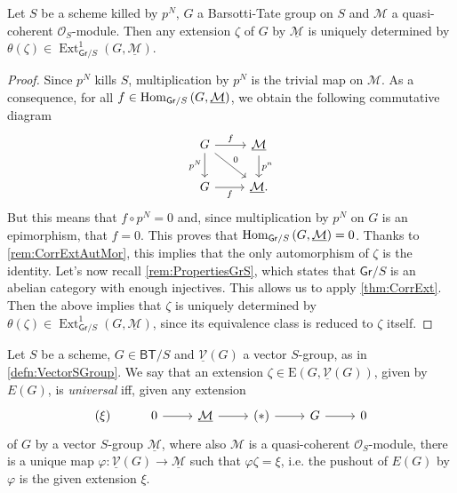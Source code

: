 \newpage
\begin{lem}\label{lem:rigidityExt}
	Let $S$ be a scheme killed by $p^N$, $G$ a Barsotti-Tate group on $S$
	and $\mathcal{M}$ a quasi-coherent $\mathcal{O}_S$-module.
	Then any extension $\zeta$ of $G$ by $\underline{\mathcal{M}}$ is
	uniquely determined by $\theta(\zeta) \in 
	\operatorname{Ext}^1_{\mathsf{Gr}/S}(G, \underline{\mathcal{M}})$.
\end{lem} 
\begin{proof}
	Since $p^N$ kills $S$, multiplication by $p^N$ 
	is the trivial map on $\mathcal{M}$.
	As a consequence, for all $f \in \operatorname{Hom}_{\mathsf{Gr}/S}
	\left( G, \underline{\mathcal{M}} \right)$,
	we obtain the following commutative diagram
	\begin{equation*}
	\begin{tikzcd}
		G \arrow[r, "f", rightarrow] 
		\arrow[d, "p^N"', rightarrow] 
		\arrow[rd, "0", rightarrow] &
		\underline{\mathcal{M}} \arrow[d, "p^n", rightarrow] \\
		G \arrow[r, "f"', rightarrow] &
		\underline{\mathcal{M}}
	.\end{tikzcd}
	\end{equation*}
	But this means that $f \circ p^N = 0$ and, since multiplication
	by $p^N$ on $G$ is an epimorphism, that $f = 0$.
	This proves that $\operatorname{Hom}_{ \mathsf{Gr}/S } \left( G, \underline{\mathcal{M}} \right) = 0$.
	Thanks to \cref{rem:CorrExtAutMor}, this implies that
	the only automorphism of $\zeta$ is the identity.
	Let's now recall \cref{rem:PropertiesGrS},
	which states that $\mathsf{Gr}/S$ is an abelian category with enough injectives.
	This allows us to apply \cref{thm:CorrExt}.
	Then the above implies that $\zeta$ is uniquely determined by $\theta(\zeta)
	\in \operatorname{Ext}^1_{\mathsf{Gr}/S}(G, \underline{\mathcal{M}})$,
	since its equivalence class is reduced to $\zeta$ itself.
\end{proof}


\begin{defn}
	Let $S$ be a scheme, $G \in \mathsf{BT}/S$
	and $\underline{\mathcal{V}}(G)$ a vector $S$-group,
	as in \cref{defn:VectorSGroup}.
	We say that an extension $\zeta \in \mathrm{E}(G, \underline{\mathcal{V}}(G))$, given
	by $E(G)$, is \emph{universal} iff, given any extension
	\begin{equation*}
	\begin{tikzcd}
		(\xi) &
		0 \arrow[r, "", rightarrow] &
		\underline{\mathcal{M}} \arrow[r, "", rightarrow] &
		(*) \arrow[r, "", rightarrow] &
		G \arrow[r, "", rightarrow] &
		0
	\end{tikzcd}
	\end{equation*}
	of $G$ by a vector $S$-group $\underline{\mathcal{M}}$,
	where also $\mathcal{M}$ is a quasi-coherent $\mathcal{O}_{ S }$-module,
	there is a unique map $\varphi\colon \underline{\mathcal{V}}(G) \to \underline{\mathcal{M}}$
	such that $\varphi\zeta = \xi$, i.e. the pushout of
	$E(G)$ by $\varphi$ is the given extension $\xi$.
\end{defn}


